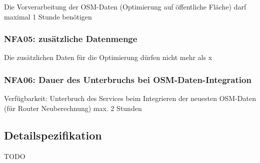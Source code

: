 Die Vorverarbeitung der \ac{OSM}-Daten (Optimierung auf öffentliche Fläche) darf maximal 1 Stunde benötigen

\subsubsection{NFA05: zusätzliche Datenmenge}
\label{NFA:NFA05}

Die zusätzlichen Daten für die Optimierung dürfen nicht mehr als x%

\subsubsection{NFA06: Dauer des Unterbruchs bei OSM-Daten-Integration}
\label{NFA:NFA06}

Verfügbarkeit: Unterbruch des Services beim Integrieren der neuesten \ac{OSM}-Daten (für Router Neuberechnung) max. 2 Stunden

\subsection{Detailspezifikation}
\label{sub:Detailspezifikation}

TODO